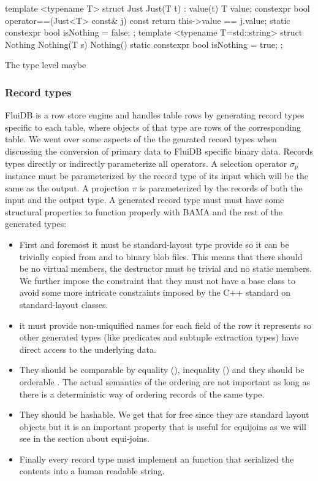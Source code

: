 \begin{code}
\begin{cppcode}
template <typename T>
struct Just {
  Just(T t) : value(t) {}
  T value;
  constexpr bool operator==(Just<T> const& j) const {
    return this->value == j.value;
  }
  static constexpr bool isNothing = false;
};
template <typename T=std::string>
struct Nothing {
  Nothing(T s) {}
  Nothing() {}
  static constexpr bool isNothing = true;
};
\end{cppcode}
\caption{\label{lst:maybe_type_cpp}The type level maybe}
\end{code}

\subsubsection{Record types}

FluiDB is a row store engine and handles table rows by generating
record types specific to each table, where objects of that type are
rows of the corresponding table. We went over some aspects of the the
genrated record types when discussing the conversion of primary data
to FluiDB specific binary data. Records types directly or indirectly
parameterize all operators. A selection operator \(\sigma_p\) instance
must be parameterized by the record type of its input which will be
the same as the output. A projection \(\pi\) is parameterized by the
records of both the input and the output type. A generated record type
must must have some structural properties to function properly with
BAMA and the rest of the generated types:

\begin{itemize}
\item First and foremost it must be standard-layout type provide so it can
be trivially copied from and to binary blob files. This means that
there should be no virtual members, the destructor must be trivial
and no static members. We further impose the constraint that they
must not have a base class to avoid some more intricate constraints
imposed by the C++ standard on standard-layout classes.
\item it must provide non-uniquified names for each field of the row it
represents so other generated types (like predicates and subtuple
extraction types) have direct access to the underlying data.
\item They should be comparable by equality (\cpp{==}), inequality (\cpp{!=}) and
they should be orderable \cpp{<}. The actual semantics of the ordering
are not important as long as there is a deterministic way of
ordering records of the same type.
\item They should be hashable. We get that for free since they are
standard layout objects but it is an important property that is
useful for equijoins as we will see in the section about equi-joins.
\item Finally every record type must implement an 
function that serialized the contents into a human readable string.
\end{itemize}

